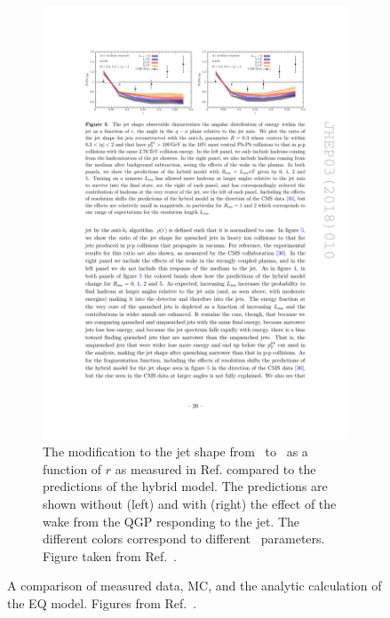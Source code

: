 \begin{figure}
\begin{subfigure}{1\textwidth}
\includegraphics[width=1\textwidth]{figures/jetMeasurements/HM_jetShape}
\caption{The modification to the jet shape from \pp\ to \pbpb\ as a function of $r$ as measured in Ref.
\cite{Chatrchyan:2013kwa} compared to the predictions of the hybrid model.
The predictions are shown without (left) and with (right) the effect of the wake from the QGP responding to the jet.
The different colors correspond to different \Lres\ parameters.
Figure taken from Ref.~\cite{Hulcher:2017cpt}.}
\label{fig:hm_jetshape}
\end{subfigure}
\caption{A comparison of measured data, MC, and the analytic calculation of the EQ model.
Figures from Ref.~\cite{Spousta:2015fca}.}
\label{fig:HM_modification}
\end{figure}


